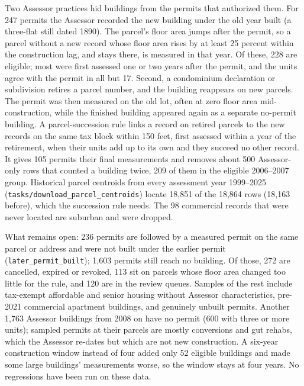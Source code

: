 Two Assessor practices hid buildings from the permits that authorized them. For 247 permits the Assessor recorded
the new building under the old year built (a three-flat still dated 1890). The parcel's floor area jumps after the
permit, so a parcel without a new record whose floor area rises by at least 25 percent within the construction lag,
and stays there, is measured in that year. Of these, 228 are eligible; most were first assessed one or two years
after the permit, and the units agree with the permit in all but 17. Second, a condominium declaration or subdivision
retires a parcel number, and the building reappears on new parcels. The permit was then measured on the old lot,
often at zero floor area mid-construction, while the finished building appeared again as a separate no-permit
building. A parcel-succession rule links a record on retired parcels to the new records on the same tax block within
150 feet, first assessed within a year of the retirement, when their units add up to its own and they succeed no
other record. It gives 105 permits their final measurements and removes about 500 Assessor-only rows that counted a
building twice, 209 of them in the eligible 2006--2007 group. Historical parcel centroids from every assessment year
1999--2025 (\texttt{tasks/download\_parcel\_centroids}) locate 18,851 of the 18,864 rows (18,163 before), which
the succession rule needs. The 98 commercial records that were never located are suburban and were dropped.

What remains open: 236 permits are followed by a measured permit on the same parcel or address and were not built
under the earlier permit (\texttt{later\_permit\_built}); 1,603 permits still reach no building. Of those, 272 are
cancelled, expired or revoked, 113 sit on parcels whose floor area changed too little for the rule, and 120 are in
the review queues. Samples of the rest include tax-exempt affordable and senior housing without Assessor
characteristics, pre-2021 commercial apartment buildings, and genuinely unbuilt permits. Another 1,763 Assessor
buildings from 2008 on have no permit (600 with three or more units); sampled permits at their parcels are mostly
conversions and gut rehabs, which the Assessor re-dates but which are not new construction. A six-year construction
window instead of four added only 52 eligible buildings and made some large buildings' measurements worse, so the
window stays at four years. No regressions have been run on these data.
